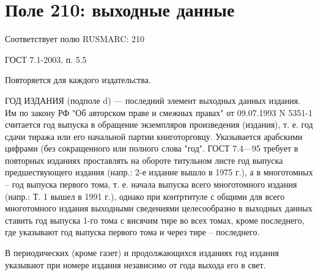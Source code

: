 \chapter{Поле 210: выходные данные}

Соответствует полю RUSMARC: 210

ГОСТ 7.1-2003, п. 5.5

Повторяется для каждого издательства.

ГОД ИЗДАНИЯ (подполе d) — последний элемент выходных данных издания. Им по закону РФ "Об авторском праве и смежных правах" от 09.07.1993 N 5351-1 считается год выпуска в обращение экземпляров произведения (издания), т. е. год сдачи тиража или его начальной партии книготорговцу. Указывается арабскими цифрами (без сокращенного или полного слова "год". ГОСТ 7.4—95 требует в повторных изданиях проставлять на обороте титульном листе год выпуска предшествующего издания (напр.: 2-е издание вышло в 1975 г.), а в многотомных -- год выпуска первого тома, т. е. начала выпуска всего многотомного издания (напр.: Т. 1 вышел в 1991 г.), однако при контртитуле с общими для всего многотомного издания выходными сведениями целесообразно в выходных данных ставить год выпуска 1-го тома с висячим тире во всех томах, кроме последнего, где указывают год выпуска первого тома и через тире -- последнего.

В периодических (кроме газет) и продолжающихся изданиях год издания указывают при номере издания независимо от года выхода его в свет.
